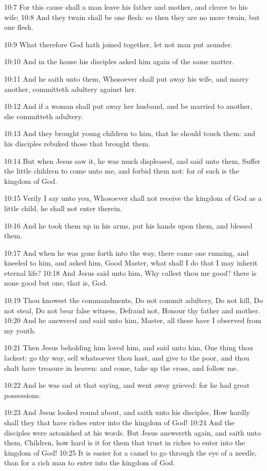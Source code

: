 10:7 For this cause shall a man leave his father and mother, and
cleave to his wife; 10:8 And they twain shall be one flesh: so then
they are no more twain, but one flesh.

10:9 What therefore God hath joined together, let not man put asunder.

10:10 And in the house his disciples asked him again of the same
matter.

10:11 And he saith unto them, Whosoever shall put away his wife, and
marry another, committeth adultery against her.

10:12 And if a woman shall put away her husband, and be married to
another, she committeth adultery.

10:13 And they brought young children to him, that he should touch
them: and his disciples rebuked those that brought them.

10:14 But when Jesus saw it, he was much displeased, and said unto
them, Suffer the little children to come unto me, and forbid them not:
for of such is the kingdom of God.

10:15 Verily I say unto you, Whosoever shall not receive the kingdom
of God as a little child, he shall not enter therein.

10:16 And he took them up in his arms, put his hands upon them, and
blessed them.

10:17 And when he was gone forth into the way, there came one running,
and kneeled to him, and asked him, Good Master, what shall I do that I
may inherit eternal life?  10:18 And Jesus said unto him, Why callest
thou me good? there is none good but one, that is, God.

10:19 Thou knowest the commandments, Do not commit adultery, Do not
kill, Do not steal, Do not bear false witness, Defraud not, Honour thy
father and mother.  10:20 And he answered and said unto him, Master,
all these have I observed from my youth.

10:21 Then Jesus beholding him loved him, and said unto him, One thing
thou lackest: go thy way, sell whatsoever thou hast, and give to the
poor, and thou shalt have treasure in heaven: and come, take up the
cross, and follow me.

10:22 And he was sad at that saying, and went away grieved: for he had
great possessions.

10:23 And Jesus looked round about, and saith unto his disciples, How
hardly shall they that have riches enter into the kingdom of God!
10:24 And the disciples were astonished at his words. But Jesus
answereth again, and saith unto them, Children, how hard is it for
them that trust in riches to enter into the kingdom of God!  10:25 It
is easier for a camel to go through the eye of a needle, than for a
rich man to enter into the kingdom of God.

